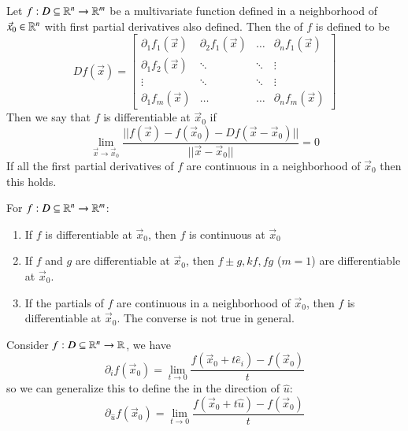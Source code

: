\documentclass[12pt, a4paper, oneside, openright, titlepage]{book}
\begin{document}
\begin{appendices}
    \begin{defn}
        Let $f:D\subseteq \mathbb R^n\rightarrow \mathbb R^m$ be a multivariate function defined in a neighborhood of $\vec{x}_0 \in \mathbb R^n$ with first partial derivatives also defined. Then the  of $f$ is defined to be \begin{equation}
            Df(\vec{x}) = \begin{bmatrix} \partial_1f_1(\vec{x}) & \partial_2f_1(\vec{x}) & \hdots & \partial_nf_1(\vec{x}) \\
                \partial_1f_2(\vec{x}) & \ddots & \ddots & \vdots \\
                \vdots & \ddots & \ddots & \vdots \\
                \partial_1f_m(\vec{x}) & \hdots & \hdots & \partial_nf_m(\vec{x})
            \end{bmatrix}
        \end{equation}
        Then we say that $f$ is differentiable at $\vec{x}_0$ if \begin{equation}
            \lim_{\vec{x}\rightarrow \vec{x}_0}\frac{||f(\vec{x}) - f(\vec{x}_0) - Df(\vec{x} - \vec{x}_0)||}{||\vec{x} - \vec{x}_0||} = 0
        \end{equation}
        If all the first partial derivatives of $f$ are continuous in a neighborhood of $\vec{x}_0$ then this holds.
    \end{defn}


    \begin{rmk}[Properties]
        For $f:D \subseteq \mathbb R^n\rightarrow \mathbb R^m$: \begin{enumerate}
            \item If $f$ is differentiable at $\vec{x}_0$, then $f$ is continuous at $\vec{x}_0$
            \item If $f$ and $g$ are differentiable at $\vec{x}_0$, then $f\pm g, kf, fg$ ($m = 1$) are differentiable at $\vec{x}_0$.
            \item If the partials of $f$ are continuous in a neighborhood of $\vec{x}_0$, then $f$ is differentiable at $\vec{x}_0$. The converse is not true in general.
        \end{enumerate}
    \end{rmk}

    \begin{defn}
        Consider $f:D\subseteq \mathbb R^n\rightarrow \mathbb R$, we have \begin{equation}
            \partial_if(\vec{x}_0) = \lim_{t\rightarrow 0}\frac{f(\vec{x}_0+t\hat{e}_i) - f(\vec{x}_0)}{t}
        \end{equation}
        so we can generalize this to define the  in the direction of $\hat{u}$: \begin{equation}
            \partial_{\hat{u}}f(\vec{x}_0) = \lim_{t\rightarrow 0}\frac{f(\vec{x}_0+t\hat{u}) - f(\vec{x}_0)}{t}
        \end{equation}
    \end{defn}


\end{appendices}
\end{document}
